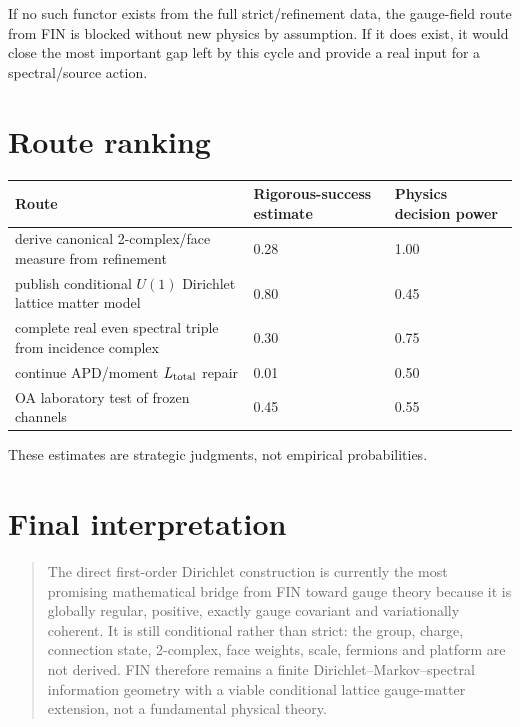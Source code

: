 \documentclass[11pt,a4paper]{article}
\begin{document}
If no such functor exists from the full strict/refinement data, the gauge-field
route from FIN is blocked without new physics by assumption.  If it does
exist, it would close the most important gap left by this cycle and provide a
real input for a spectral/source action.

\section{Route ranking}

\begin{longtable}{@{}p{}p{}p{}@{}}
\toprule
Route & Rigorous-success estimate & Physics decision power \\
\midrule\endhead
derive canonical 2-complex/face measure from refinement & 0.28 & 1.00 \\
publish conditional $U(1)$ Dirichlet lattice matter model & 0.80 & 0.45 \\
complete real even spectral triple from incidence complex & 0.30 & 0.75 \\
continue APD/moment $L_{\rm total}$ repair & 0.01 & 0.50 \\
OA laboratory test of frozen channels & 0.45 & 0.55 \\
\bottomrule
\end{longtable}

These estimates are strategic judgments, not empirical probabilities.

\section{Final interpretation}

\begin{quote}
The direct first-order Dirichlet construction is currently the most promising
mathematical bridge from FIN toward gauge theory because it is globally
regular, positive, exactly gauge covariant and variationally coherent.  It is
still conditional rather than strict: the group, charge, connection state,
2-complex, face weights, scale, fermions and platform are not derived.  FIN
therefore remains a finite Dirichlet--Markov--spectral information geometry
with a viable conditional lattice gauge-matter extension, not a fundamental
physical theory.
\end{quote}

\appendix
\end{document}
